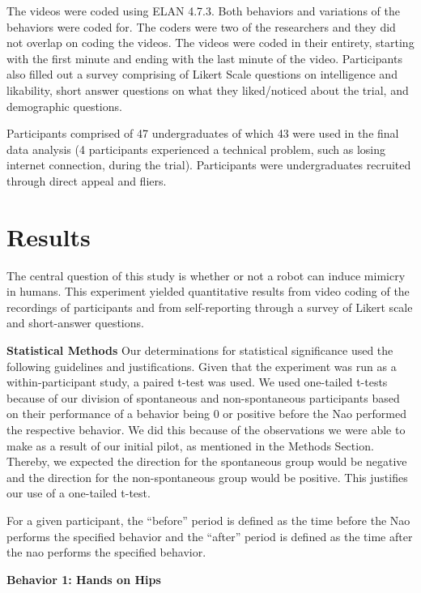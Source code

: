 \documentclass{acm_proc_article-sp}
\begin{document}
The videos were coded using ELAN 4.7.3. Both behaviors and variations of the behaviors were coded for. The coders were two of the researchers and they did not overlap on coding the videos. The videos were coded in their entirety, starting with the first minute and ending with the last minute of the video. Participants also filled out a survey comprising of Likert Scale questions on intelligence and likability, short answer questions on what they liked/noticed about the trial, and demographic questions. 

Participants comprised of 47 undergraduates of which 43 were used in the final data analysis (4 participants experienced a technical problem, such as losing internet connection, during the trial). Participants were undergraduates recruited through direct appeal and fliers.

\section{Results}
The central question of this study is whether or not a robot can induce mimicry in humans. This experiment yielded quantitative results from video coding of the recordings of participants and from self-reporting through a survey of Likert scale and short-answer questions. 

\textbf{Statistical Methods} Our determinations for statistical significance used the following guidelines and justifications. 
Given that the experiment was run as a within-participant study, a paired t-test was used. We used one-tailed t-tests because of our division of spontaneous and non-spontaneous participants based on their performance of a behavior being 0 or positive before the Nao performed the respective behavior. We did this because of the observations we were able to make as a result of our initial pilot, as mentioned in the Methods Section. Thereby, we expected the direction for the spontaneous group would be negative and the direction for the non-spontaneous group would be positive. This justifies our use of a one-tailed t-test. 

For a given participant, the ``before'' period is defined as the time before the Nao performs the specified behavior and the ``after'' period is defined as the time after the nao performs the specified behavior.

\textbf{Behavior 1: Hands on Hips} 
\end{document}
